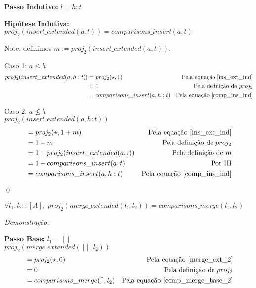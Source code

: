 \documentclass[12pt, oneside, a4paper,english,brazil]{abntex2}
\begin{document}
\textbf{Passo Indutivo: } $l = h : t$

\textbf{Hip\'otese Indutiva: } $proj_{2}(insert\_extended(a, t)) = comparisons\_insert(a, t)$

Note: definimos $m := proj_{2}(insert\_extended(a, t))$.

Caso 1: $a \le h$
\begin{align*}
  proj_{2}(insert\_extended(a, h : t)) &= proj_{2}(\star, 1) &\text{Pela equa\c{c}\~ao \ref{ins_ext_ind}}\\
                                       &= 1 &\text{Pela defini\c{c}\~ao de } proj_{2} \\
  &= comparisons\_insert(a, h : t) &\text{Pela equa\c{c}\~ao \ref{comp_ins_ind}}
\end{align*}

Caso 2: $a \not\le h$ \\

$proj_{2}(insert\_extended(a, h : t))$
\begin{align*}
  &= proj_{2}(\star, 1 + m) &\text{Pela equa\c{c}\~ao \ref{ins_ext_ind}} \\
                                    &= 1 + m &\text{Pela defini\c{c}\~ao de } proj_{2} \\
                                    &= 1 + proj_{2}(insert\_extended(a, t)) &\text{Pela defini\c{c}\~ao de } m\\
                                    &= 1 + comparisons\_insert(a, t) &\text{Por HI} \\
  &= comparisons\_insert(a, h : t) &\text{Pela equa\c{c}\~ao \ref{comp_ins_ind}}
\end{align*}

\qed

\begin{teorema}
  $\forall l_{1}, l_{2} :: [A], \,\, proj_{2}(merge\_extended(l_{1}, l_{2})) = comparisons\_merge(l_{1}, l_{2})$
\end{teorema}

\noindent \textit{Demonstra\c{c}\~ao.}

\textbf{Passo Base: } $l_{1} = []$\\

$proj_{2}(merge\_extended([], l_{2}))$
\begin{align*}
  &= proj_{2}(\star, 0) &\text{Pela equa\c{c}\~ao \ref{merge_ext_2}} \\
                                       &= 0 &\text{Pela defini\c{c}\~ao de $proj_{2}$} \\
  &= comparisons\_merge([], l_{2}) &\text{Pela equa\c{c}\~ao \ref{comp_merge_base_2}} \\
\end{align*}
\end{document}
